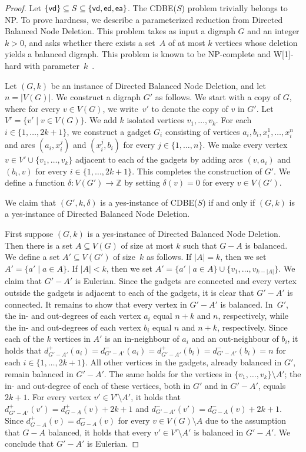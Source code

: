 \documentclass[11pt]{llncs}
\newcommand{\vd}{{\sf vd}}
\newcommand{\ed}{{\sf ed}}
\newcommand{\ea}{{\sf ea}}
\newcommand{\cdbe}{{\sc CDBE}}
\newcommand{\NP}{{\sf NP}}
\newcommand{\W}{{\sf W[1]}}
\begin{document}
\begin{proof}
Let $\{\vd\} \subseteq  S\subseteq \{\vd,\ed,\ea\}$. The \cdbe($S$) problem
trivially belongs to \NP. To prove hardness, we describe a parameterized
reduction from {\sc Directed Balanced Node Deletion}. This problem takes as
input a digraph $G$ and an integer $k>0$, and asks whether there exists a
set~$A$ of at most $k$ vertices whose deletion yields a balanced digraph. This
problem is known to be \NP-complete and \W-hard with
parameter~$k$~\cite{CyganMPPS14}.  

Let $(G,k)$ be an instance of {\sc Directed Balanced Node Deletion}, and let
$n=|V(G)|$. We construct a digraph $G'$ as follows. We start with a copy of
$G$, where for every $v\in V(G)$, we write~$v'$ to denote the copy of $v$ in
$G'$. Let $V'=\{v' \mid v\in V(G)\}$. We add $k$ isolated vertices
$v_1,\ldots,v_k$. 
For each $i\in \{1,\ldots,2k+1\}$, we construct a gadget $G_i$ consisting of
vertices $a_i,b_i,x_i^1,\ldots,x_i^{n}$ and arcs $(a_i,x_i^j)$ and
$(x_i^j,b_i)$ for every $j\in \{1,\ldots,n\}$.  We make every vertex $v\in
V'\cup \{v_1,\ldots,v_k\}$ adjacent to each of the gadgets by adding arcs
$(v,a_i)$ and $(b_i,v)$ for every $i\in \{1,\ldots,2k+1\}$. This completes the
construction of $G'$. We define a function $\delta:V(G')\rightarrow \mathbb{Z}$
by setting $\delta(v)=0$ for every $v\in V(G')$.

We claim that $(G',k,\delta)$ is a yes-instance of \cdbe($S$) if and only if
$(G,k)$ is a yes-instance of {\sc Directed Balanced Node Deletion}.

First suppose $(G,k)$ is a yes-instance of {\sc Directed Balanced Node
Deletion}. Then there is a set $A\subseteq V(G)$ of size at most $k$ such
that $G-A$ is balanced. We define a set $A'\subseteq V(G')$ of size~$k$ as
follows. If $|A|=k$, then we set $A'=\{a' \mid a \in A\}$. If $|A|<k$, then we set $A'=\{a' \mid a \in A\}\cup
\{v_1,\ldots,v_{k-|A|}\}$. We claim that $G'-A'$ is Eulerian. Since the gadgets
are connected and every vertex outside the gadgets is adjacent to each of the
gadgets, it is clear that $G'-A'$ is connected. It remains to show that every
vertex in $G'-A'$ is balanced. In~$G'$, the in- and out-degrees of each vertex
$a_i$ 
equal $n+k$ and $n$, respectively, while the in- and out-degrees of each vertex
$b_i$ equal $n$ and $n+k$, respectively.  Since each of the $k$ vertices in
$A'$ is an in-neighbour of $a_i$ and an out-neighbour of $b_i$, it holds that 
$d_{G'-A'}^+(a_i)=d_{G'-A'}^-(a_i)=d_{G'-A'}^+(b_i)=d_{G'-A'}^-(b_i)=n$ for
each $i\in \{1,\ldots,2k+1\}$.  All other vertices in the gadgets, already
balanced in $G'$, remain balanced in $G'-A'$. The same holds for the vertices
in $\{v_1,\ldots,v_k\}\setminus A'$; the in- and out-degree of each of these
vertices, both in $G'$ and in $G'-A'$, equals $2k+1$. For every vertex $v'\in
V'\setminus A'$, it holds that $d_{G'-A'}^+(v')=d_{G-A}^+(v) + 2k+1$ and
$d_{G'-A'}^-(v')=d_{G-A}^-(v) + 2k+1$. Since $d_{G-A}^+(v)=d_{G-A}^-(v)$ for
every $v\in V(G)\setminus A$ due to the assumption that $G-A$ balanced, it
holds that every $v'\in V'\setminus A'$ is balanced in $G'-A'$. We conclude
that $G'-A'$ is Eulerian.


\end{proof}
\end{document}
